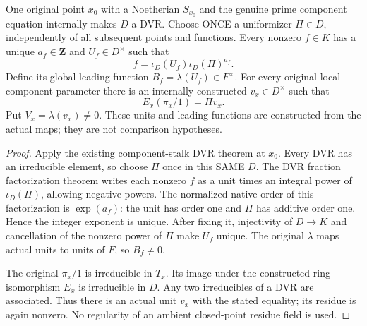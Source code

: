 \begin{definition}
\label{def:gauss-leading-one-original-uniformizer}
\leanok
One original point $x_0$ with a Noetherian $S_{x_0}$ and the genuine prime
component equation internally makes $D$ a DVR. Choose ONCE a uniformizer
$\Pi\in D$, independently of all subsequent points and functions.
Every nonzero $f\in K$ has a unique $a_f\in\mathbf Z$ and
$U_f\in D^\times$ such that
\[
 f=\iota_D(U_f)\iota_D(\Pi)^{a_f}.
\]
Define its global leading function $B_f=\lambda(U_f)\in F^\times$.
For every original local component parameter there is an internally
constructed $v_x\in D^\times$ such that
\[
 E_x(\pi_x/1)=\Pi v_x.
\]
Put $V_x=\lambda(v_x)\ne0$. These units and leading functions are
constructed from the actual maps; they are not comparison hypotheses.
\end{definition}
\begin{proof}
Apply the existing component-stalk DVR theorem at $x_0$. Every DVR has an
irreducible element, so choose $\Pi$ once in this SAME $D$.
The DVR fraction factorization theorem writes each nonzero $f$ as a unit
times an integral power of $\iota_D(\Pi)$, allowing negative powers.
The normalized native order of this factorization is $\exp(a_f)$:
the unit has order one and $\Pi$ has additive order one. Hence the
integer exponent is unique. After fixing it, injectivity of $D\to K$
and cancellation of the nonzero power of $\Pi$ make $U_f$ unique.
The original $\lambda$ maps actual units to units of $F$, so $B_f\ne0$.

The original $\pi_x/1$ is irreducible in $T_x$. Its image under the
constructed ring isomorphism $E_x$ is irreducible in $D$. Any two
irreducibles of a DVR are associated. Thus there is an actual unit
$v_x$ with the stated equality; its residue is again nonzero. No
regularity of an ambient closed-point residue field is used.
\end{proof}

